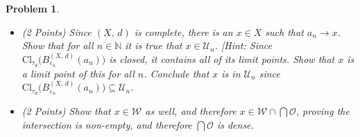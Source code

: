\documentclass{article}
\theoremstyle{normal}
\newtheorem{problem}{Problem}
\begin{document}
\begin{problem}
\begin{itemize}
                intersection of open sets is open, there is a positive $r_{0}<1$
                such that
                $B_{r_{0}}^{(X,\,d)}(a_{0})\subseteq\mathcal{U}_{0}\cap\mathcal{W}$.
                By the previous part of the problem, there is a positive
                $\varepsilon_{0}<r_{0}$ such that
                $\textrm{Cl}_{\tau_{d}}\big(B_{\varepsilon_{0}}^{(X,\,d)}(a_{0})\big)\subseteq{B}_{r_{0}}^{(X,\,d)}(a_{0})$.
                Recursively we may define $a_{n}$, $r_{n}$, and
                $\varepsilon_{n}$ such that $r_{n}<\frac{1}{n+1}$, and:
                \begin{equation}
                    \textrm{Cl}_{\tau_{d}}
                        \big(B_{\varepsilon_{n}}^{(X,\,d)}(a_{n})\big)
                    \subseteq{B}_{r_{n}}^{(X,\,d)}(a_{n})
                    \subseteq\mathcal{W}\cap\bigcap_{k=0}^{n}\mathcal{U}_{n}
                \end{equation}
                and such that:
                \begin{equation}
                    \textrm{Cl}_{\tau_{d}}
                        \big(B_{\varepsilon_{n+1}}^{(X,\,d)}(a_{n+1})\big)
                        \subseteq{B}_{\varepsilon_{n}}^{(X,\,d)}(a_{n})
                \end{equation}
                Show that $a:\mathbb{N}\rightarrow{X}$ is a Cauchy sequence.
            \item (2 Points) Since $(X,\,d)$ is complete, there is an $x\in{X}$
                such that $a_{n}\rightarrow{x}$. Show that for all
                $n\in\mathbb{N}$ it is true that $x\in\mathcal{U}_{n}$.
                [Hint: Since $\textrm{Cl}_{\tau_{d}}\big(B_{\varepsilon_{n}}^{(X,\,d)}(a_{n})\big)$
                is closed, it contains all of its limit points. Show that
                $x$ is a limit point of this for all $n$. Conclude that
                $x$ is in $\mathcal{U}_{n}$ since
                $\textrm{Cl}_{\tau_{d}}\big(B_{\varepsilon_{n}}^{(X,\,d)}(a_{n})\big)\subseteq\mathcal{U}_{n}$.
            \item (2 Points) Show that $x\in\mathcal{W}$ as well, and therefore
                $x\in\mathcal{W}\cap\bigcap\mathcal{O}$, proving the
                intersection is non-empty, and therefore $\bigcap\mathcal{O}$
                is dense.
        \end{itemize}
    \end{problem}
    \color{black}
\end{document}
